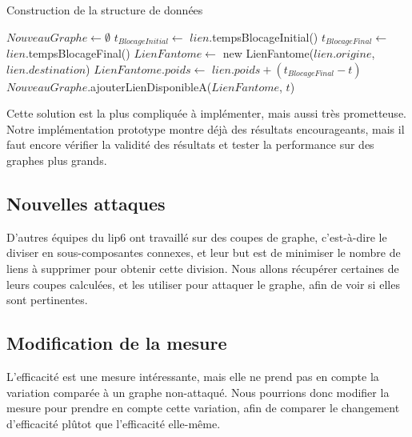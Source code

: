 \begin{algorithm}[H]
\caption{Construction de la structure de données}
\begin{algorithmic}
\State $NouveauGraphe \gets \emptyset$
    \State $t_{BlocageInitial} \gets$ $lien$.tempsBlocageInitial()
    \State $t_{BlocageFinal} \gets$ $lien$.tempsBlocageFinal()
        \State $LienFantome \gets$ new LienFantome($lien.origine$, $lien.destination$)
        \State $LienFantome.poids \gets$ $lien.poids + (t_{BlocageFinal} - t)$
        \State $NouveauGraphe$.ajouterLienDisponibleA($LienFantome$, $t$)
    \EndFor
\EndFor
\end{algorithmic}
\end{algorithm}

Cette solution est la plus compliquée à implémenter, mais aussi très prometteuse.
Notre implémentation prototype montre déjà des résultats encourageants, mais il faut encore vérifier la validité des résultats et tester la performance sur des graphes plus grands.

\subsection{Nouvelles attaques}\label{subsec:nouvelles_attaques}
D'autres équipes du lip6 ont travaillé sur des coupes de graphe, c'est-à-dire le diviser en sous-composantes connexes, et leur but est de minimiser le nombre de liens à supprimer pour obtenir cette division.
Nous allons récupérer certaines de leurs coupes calculées, et les utiliser pour attaquer le graphe, afin de voir si elles sont pertinentes.

\subsection{Modification de la mesure}
L'efficacité est une mesure intéressante, mais elle ne prend pas en compte la variation comparée à un graphe non-attaqué.
Nous pourrions donc modifier la mesure pour prendre en compte cette variation, afin de comparer le changement d'efficacité plûtot que l'efficacité elle-même.